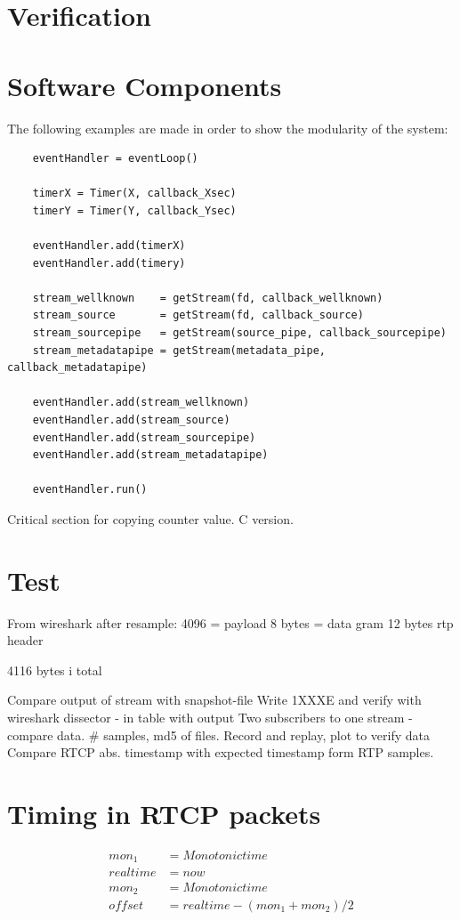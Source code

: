 \section{Verification} \label{sec:implementation:verification}


\section{Software Components}
The following examples are made in order to show the modularity of the system:



\begin{listing}[h] 
\begin{verbatim}
	eventHandler = eventLoop()
	
	timerX = Timer(X, callback_Xsec)
	timerY = Timer(Y, callback_Ysec)
	
	eventHandler.add(timerX)
	eventHandler.add(timery)
	
	stream_wellknown    = getStream(fd, callback_wellknown)
	stream_source       = getStream(fd, callback_source)
	stream_sourcepipe   = getStream(source_pipe, callback_sourcepipe)
	stream_metadatapipe = getStream(metadata_pipe, callback_metadatapipe)	
	
	eventHandler.add(stream_wellknown)
	eventHandler.add(stream_source)
	eventHandler.add(stream_sourcepipe)
	eventHandler.add(stream_metadatapipe)
	
	eventHandler.run()
\end{verbatim}
\caption{Critical section for copying counter value. C version.}
\label{code:critical_section_c}
\end{listing}



\section{Test}
From wireshark after resample:
4096 = payload
8 bytes = data gram
12 bytes rtp header

4116 bytes i total

Compare output of stream with snapshot-file
Write 1XXXE and verify with wireshark dissector
    - in table with output
Two subscribers to one stream - compare data. \# samples, md5 of files.
Record and replay, plot to verify data
Compare RTCP abs. timestamp with expected timestamp form RTP samples.

\section{Timing in RTCP packets}
\begin{align}
	mon_1 &= Monotonic time \\
	realtime &= now \\
	mon_2 &= Monotonic time \\
	offset &= realtime-(mon_1+mon_2)/2 
\end{align}



